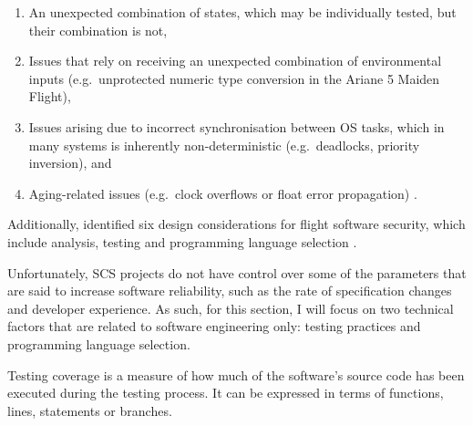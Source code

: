 \documentclass[a4paper,nobib,justified,final]{tufte-book}
\begin{document}
\begin{enumerate}[itemsep=-1ex]
	\item An unexpected combination of states, which may be individually tested, but their combination is not,
	\item Issues that rely on receiving an unexpected combination of environmental inputs (e.g.~unprotected numeric type conversion in the Ariane 5 Maiden Flight),
	\item Issues arising due to incorrect synchronisation between \acl{OS} tasks, which in many systems is inherently non-deterministic (e.g.~deadlocks, priority inversion), and
	\item Aging-related issues (e.g.~clock overflows or float error propagation) \autocite{alonsoNatureTimesFlight2012}.
\end{enumerate}%

Additionally, \citeauthor{curboResearchAgendaSpace2023} identified six design considerations for flight software security, which include analysis, testing and programming language selection \autocite{curboResearchAgendaSpace2023}.

Unfortunately, \acs{SCS} projects do not have control over some of the parameters that are said to increase software reliability, such as the rate of specification changes and developer experience. As such, for this section, I will focus on two technical factors that are related to software engineering only: testing practices and programming language selection.

\marginnote[2ex]{}%
\begin{margindefinition}
	Testing coverage is a measure of how much of the software's source code has been executed during the testing process. It can be expressed in terms of functions, lines, statements or branches.
\end{margindefinition}%
\end{document}
